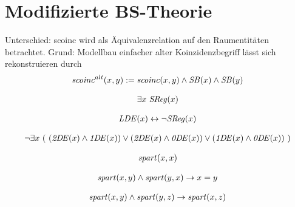 \section{Modifizierte BS-Theorie}
Unterschied: scoinc wird als Äquivalenzrelation auf den Raumentitäten betrachtet.
Grund: Modellbau einfacher
alter Koinzidenzbegriff lässt sich rekonstruieren durch
\begin{align*}
  \mathit{scoinc}^{alt}(x,y) := \mathit{scoinc}(x,y) \land \mathit{S\hspace*{-0.25ex}B}(x) \land \mathit{S\hspace*{-0.25ex}B}(y)
\end{align*}


\begin{erin}
    \begin{align*}
        \exists x\ \mathit{S\hspace*{-0.25ex}Reg}(x)
    \end{align*}
\end{erin}

\begin{erin}
    \begin{align*}
        \mathit{LDE}(x) \leftrightarrow \neg\mathit{S\hspace*{-0.25ex}Reg}(x)
    \end{align*}
\end{erin}
                
\begin{erin}
    \begin{align*}
        \neg\exists x\ (\ (\mathit{2D\hspace*{-0.25ex} E}(x) \wedge \mathit{1D\hspace*{-0.25ex} E}(x)) \vee (\mathit{2D\hspace*{-0.25ex} E}(x) \wedge \mathit{0D\hspace*{-0.25ex} E}(x)) \vee (\mathit{1D\hspace*{-0.25ex} E}(x) \wedge \mathit{0D\hspace*{-0.25ex} E}(x))\ )
    \end{align*}
\end{erin}

\begin{erin}
    \begin{align*}
        \mathit{spart}(x,x)
    \end{align*}
\end{erin}

\begin{erin}
    \begin{align*}
        \mathit{spart}(x,y) \wedge \mathit{spart}(y,x) \to x=y
    \end{align*}
\end{erin}

\begin{erin}
    \begin{align*}
        \mathit{spart}(x,y) \wedge \mathit{spart}(y,z) \to \mathit{spart}(x,z)
    \end{align*}
\end{erin}
             
